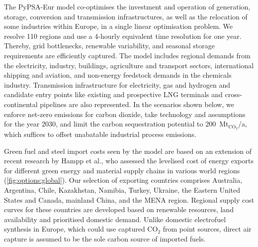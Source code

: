 The PyPSA-Eur\cite{PyPSAEurSecSectorCoupled} model co-optimises the investment
and operation of generation, storage, conversion and transmission
infrastructures, as well as the relocation of some industries within
Europe,\cite{verpoortEstimatingRenewables2023,samadiRenewablesPull2023} in a
single linear optimisation problem. We resolve 110 regions
and use a 4-hourly
equivalent time resolution for one year. Thereby, grid bottlenecks, renewable
variability, and seasonal storage requirements are efficiently captured.
The
model includes regional demands from the electricity, industry, buildings,
agriculture and transport sectors, international shipping and aviation, and
non-energy feedstock demands in the chemicals industry. Transmission
infrastructure for electricity, gas and hydrogen and candidate entry points like
existing and prospective LNG terminals and cross-continental pipelines are also
represented. In the scenarios shown below, we enforce net-zero emissions for
carbon dioxide, take technology and assumptions for the year 2030,\cite{dea2019}
and limit the carbon sequestration potential to 200~Mt$_{\text{CO}_2}$/a, which
suffices to offset unabatable industrial process emissions.

Green fuel and steel import costs seen by the model are based on an extension of
recent research by Hampp et al.,\cite{hamppImportOptions2023} who assessed the
levelised cost of energy exports for different green energy and material supply
chains in various world regions (\cref{fig:options:global}). Our selection of
exporting countries comprises Australia, Argentina, Chile, Kazakhstan, Namibia,
Turkey, Ukraine, the Eastern United States and Canada, mainland China, and the
MENA region. Regional supply cost curves for these countries are developed based
on renewable resources, land availability and prioritised domestic demand.
Unlike domestic electrofuel synthesis in Europe, which could use captured CO$_2$
from point sources, direct air capture is assumed to be the sole carbon source
of imported fuels.

